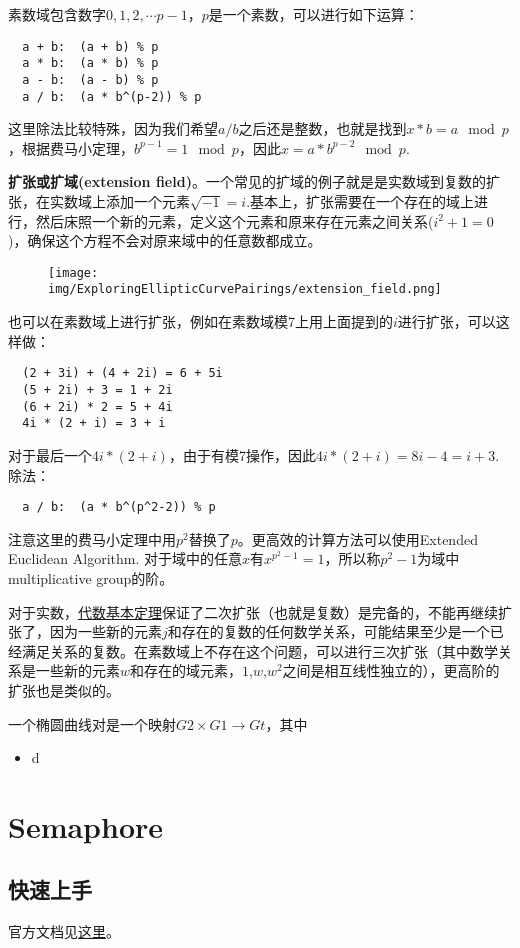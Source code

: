 \documentclass[10pt]{ctexart}
\begin{document}
素数域包含数字$0,1,2,\cdots p-1$，$p$是一个素数，可以进行如下运算：
\begin{lstlisting}
  a + b:  (a + b) % p
  a * b:  (a * b) % p
  a - b:  (a - b) % p
  a / b:  (a * b^(p-2)) % p
\end{lstlisting}
这里除法比较特殊，因为我们希望$a/b$之后还是整数，也就是找到$x * b = a \mod p$，根据费马小定理，$b^{p-1} = 1 \mod p$，因此$x = a * b^{p-2} \mod p$.

\textbf{扩张或扩域(extension field)}。一个常见的扩域的例子就是是实数域到复数的扩张，在实数域上添加一个元素$\sqrt{-1}=i$.基本上，扩张需要在一个存在的域上进行，然后床照一个新的元素，定义这个元素和原来存在元素之间关系($i^2 + 1 = 0$)，确保这个方程不会对原来域中的任意数都成立。
\begin{figure}[H]
	\centering
	\texttt{[image: img/ExploringEllipticCurvePairings/extension\_field.png]}
\end{figure}
也可以在素数域上进行扩张，例如在素数域模7上用上面提到的$i$进行扩张，可以这样做：
\begin{lstlisting}
  (2 + 3i) + (4 + 2i) = 6 + 5i
  (5 + 2i) + 3 = 1 + 2i
  (6 + 2i) * 2 = 5 + 4i
  4i * (2 + i) = 3 + i
\end{lstlisting}
对于最后一个$4i * (2 + i)$，由于有模7操作，因此$4i * (2 + i) = 8i - 4 = i + 3$. 除法：
\begin{lstlisting}
  a / b:  (a * b^(p^2-2)) % p
\end{lstlisting}
注意这里的费马小定理中用$p^2$替换了$p$。更高效的计算方法可以使用Extended Euclidean Algorithm. 对于域中的任意$x$有$x^{p^2-1}=1$，所以称$p^2-1$为域中multiplicative group的阶。

对于实数，\href{https://en.wikipedia.org/wiki/Fundamental_theorem_of_algebra}{代数基本定理}保证了二次扩张（也就是复数）是完备的，不能再继续扩张了，因为一些新的元素$j$和存在的复数的任何数学关系，可能结果至少是一个已经满足关系的复数。在素数域上不存在这个问题，可以进行三次扩张（其中数学关系是一些新的元素$w$和存在的域元素，$1$,$w$,$w^2$之间是相互线性独立的），更高阶的扩张也是类似的。

一个椭圆曲线对是一个映射$G2 \times G1 \rightarrow Gt$，其中
\begin{itemize}
	\item d
\end{itemize}

\section{Semaphore}
\subsection{快速上手}
官方文档见\href{https://semaphore.appliedzkp.org/}{这里}。
\end{document}
